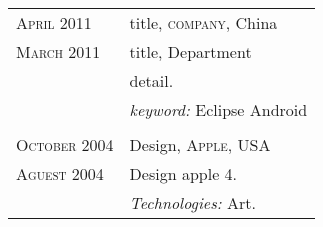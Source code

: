 %
%




\begin{longtable}{R{2.5cm}|p{14.8cm}}

 	\textsc{April 2011} & title, \textsc{company}, China\\
 	\textsc{March 2011}& title, Department\\&
 	\footnotesize{detail.}\\&
 	\footnotesize{\emph{keyword:} Eclipse  Android  }\\
 \\
 
 	\textsc{October 2004} & Design, \textsc{Apple}, USA\\
 	\textsc{Aguest 2004}&\footnotesize{ Design apple 4. }\\&
 	\footnotesize{\emph{Technologies:} Art.}\\
\end{longtable}